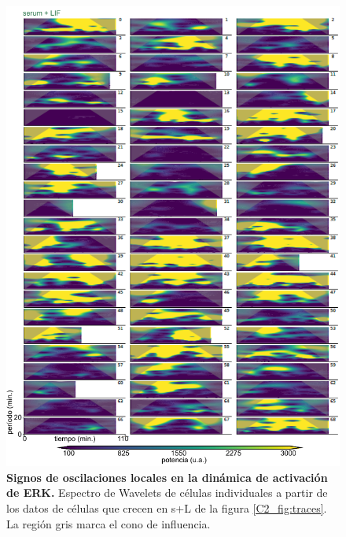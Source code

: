 \documentclass[./main.tex]{subfiles}
\begin{document}
 \begin{figure}
    \centering
    \includegraphics[width=1\columnwidth]{figures/chapter2/C2_wavelets_WT.pdf}\caption{\textbf{Signos de oscilaciones locales en la dinámica de activación de ERK.} Espectro de Wavelets de células individuales a partir de los datos de células que crecen en s+L de la figura \ref{C2_fig:traces}. La región gris marca el cono de influencia.}
    \label{C2_fig:wavelets_WT}
\end{figure}
\end{document}
